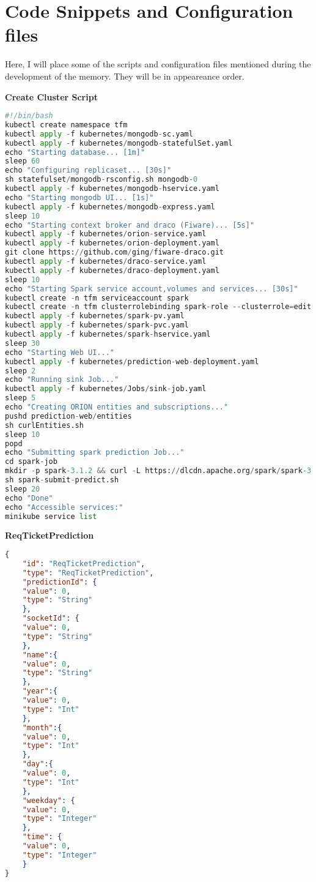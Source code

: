 \chapter{Code Snippets and Configuration files}

Here, I will place some of the scripts and configuration files mentioned during the development of the memory. They will be in appeareance order.

\textbf{Create Cluster Script}

\begin{lstlisting}[language=python, caption=Create Cluster script to automatically deploy the whole platform on minikube, label=CreateCluster]
#!/bin/bash
kubectl create namespace tfm
kubectl apply -f kubernetes/mongodb-sc.yaml
kubectl apply -f kubernetes/mongodb-statefulSet.yaml
echo "Starting database... [1m]"
sleep 60
echo "Configuring replicaset... [30s]"
sh statefulset/mongodb-rsconfig.sh mongodb-0
kubectl apply -f kubernetes/mongodb-hservice.yaml
echo "Starting mongodb UI... [1s]"
kubectl apply -f kubernetes/mongodb-express.yaml
sleep 10
echo "Starting context broker and draco (Fiware)... [5s]"
kubectl apply -f kubernetes/orion-service.yaml
kubectl apply -f kubernetes/orion-deployment.yaml
git clone https://github.com/ging/fiware-draco.git
kubectl apply -f kubernetes/draco-service.yaml
kubectl apply -f kubernetes/draco-deployment.yaml
sleep 10
echo "Starting Spark service account,volumes and services... [30s]"
kubectl create -n tfm serviceaccount spark
kubectl create -n tfm clusterrolebinding spark-role --clusterrole=edit --serviceaccount=tfm:spark --namespace=tfm
kubectl apply -f kubernetes/spark-pv.yaml
kubectl apply -f kubernetes/spark-pvc.yaml
kubectl apply -f kubernetes/spark-hservice.yaml
sleep 30
echo "Starting Web UI..."
kubectl apply -f kubernetes/prediction-web-deployment.yaml
sleep 2
echo "Running sink Job..."
kubectl apply -f kubernetes/Jobs/sink-job.yaml
sleep 5
echo "Creating ORION entities and subscriptions..."
pushd prediction-web/entities
sh curlEntities.sh
sleep 10
popd
echo "Submitting spark prediction Job..."
cd spark-job
mkdir -p spark-3.1.2 && curl -L https://dlcdn.apache.org/spark/spark-3.1.2/spark-3.1.2-bin-hadoop3.2.tgz | tar -zx -C spark-3.1.2/ --strip 1
sh spark-submit-predict.sh
sleep 20
echo "Done"
echo "Accessible services:"
minikube service list
\end{lstlisting}

\textbf{ReqTicketPrediction}

\begin{lstlisting}[language=json, caption=Definition file for the Orion entity that will define our requests tickets, label=ReqTicketPrediction]
{
    "id": "ReqTicketPrediction",
    "type": "ReqTicketPrediction",
    "predictionId": {
    "value": 0,
    "type": "String"
    },
    "socketId": {
    "value": 0,
    "type": "String"
    },
    "name":{
    "value": 0,
    "type": "String"
    },
    "year":{
    "value": 0,
    "type": "Int"
    },
    "month":{
    "value": 0,
    "type": "Int"
    },
    "day":{
    "value": 0,
    "type": "Int"
    },
    "weekday": {
    "value": 0,
    "type": "Integer"
    },
    "time": {
    "value": 0,
    "type": "Integer"
    }
}
\end{lstlisting}

